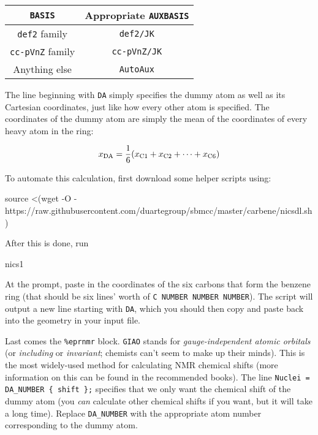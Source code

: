 \documentclass[10pt]{article}
\begin{document}
\begin{center}
    \begin{tabular}{cc}
        \toprule
        \texttt{BASIS} & Appropriate \texttt{AUXBASIS} \\ \midrule
        \texttt{def2} family & \texttt{def2/JK} \\
        \texttt{cc-pVnZ} family & \texttt{cc-pVnZ/JK} \\
        Anything else & \texttt{AutoAux} \\
        \bottomrule
    \end{tabular}
\end{center}

The line beginning with \texttt{DA} simply specifies the dummy atom as well as its Cartesian coordinates, just like how every other atom is specified. The coordinates of the dummy atom are simply the mean of the coordinates of every heavy atom in the ring:

\[ x_{\ce{DA}} = \frac{1}{6}(x_{\ce{C}1} + x_{\ce{C}2} + \cdots + x_{\ce{C}6}) \]

To automate this calculation, first download some helper scripts using:

\begin{cmdline}
source <(wget -O - https://raw.githubusercontent.com/duartegroup/sbmcc/master/carbene/nicsdl.sh)
\end{cmdline}

After this is done, run

\begin{cmdline}
nics1
\end{cmdline}

At the prompt, paste in the coordinates of the six carbons that form the benzene ring (that should be six lines' worth of \texttt{C   NUMBER   NUMBER   NUMBER}). The script will output a new line starting with \texttt{DA}, which you should then copy and paste back into the geometry in your input file.

Last comes the \texttt{\%eprnmr} block. \texttt{GIAO} stands for \textit{gauge-independent atomic orbitals} (or \textit{including} or \textit{invariant}; chemists can't seem to make up their minds). This is the most widely-used method for calculating NMR chemical shifts (more information on this can be found in the recommended books). The line \texttt{Nuclei = DA\_NUMBER \{ shift \};} specifies that we only want the chemical shift of the dummy atom (you \textit{can} calculate other chemical shifts if you want, but it will take a long time). Replace \texttt{DA\_NUMBER} with the appropriate atom number corresponding to the dummy atom.
\end{document}
